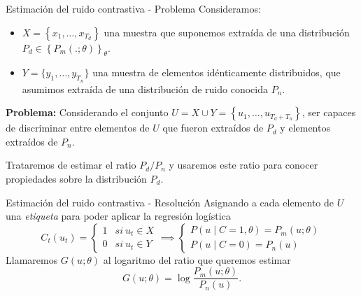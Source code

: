 \documentclass[aspectratio=169]{beamer}
\begin{document}
  \begin{frame}{Estimación del ruido contrastiva - Problema}
    Consideramos: 
    \begin{itemize}
      \item \( X = \left\{x_1,\dots,x_{T_d}\right\}\) una muestra que suponemos extraída de una distribución \( P_d \in \left\{P_m(.;\theta)\right\}_\theta \).
      \item \( Y = \{ y_1,\dots,y_{T_n}\}\) una muestra de elementos idénticamente distribuidos, que asumimos extraída de una distribución de ruido conocida \( P_n\).

    \end{itemize}
    \pause
  
    \begin{shaded}
      \textbf{Problema:} Considerando el conjunto \(U = X \cup Y = \left\{u_1,\dots,u_{T_d+T_n}\right\}\), ser capaces de discriminar entre elementos de \(U\) que fueron extraídos de \(P_d\) y elementos extraídos de \(P_n\).
    \end{shaded}
    \pause
    Trataremos de estimar el ratio \(P_d/P_n\) y usaremos este ratio para conocer propiedades sobre la distribución \(P_d\).
  \end{frame}
  \begin{frame}{Estimación del ruido contrastiva - Resolución}
    Asignando a cada elemento de \(U\) una \emph{etiqueta} para poder aplicar la regresión logística
    \[
      C_t(u_t) = \begin{cases}
      1 & si \ u_t \in X\\
      0 & si \ u_t \in Y
      \end{cases} \implies \begin{cases}
        P(u\mid C = 1,\theta) = P_m(u;\theta) \\
         P(u\mid C = 0) = P_n(u)
        \end{cases}
    \]
    Llamaremos \(G(u;\theta)\) al logaritmo del ratio que queremos estimar 
    \[
      G(u;\theta) = \log \frac{P_m(u;\theta)}{P_n(u)} .
      \]
  \end{frame}
\end{document}
